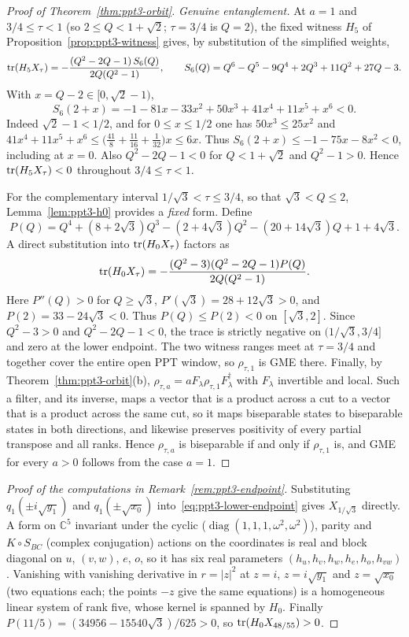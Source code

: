 \begin{proof}[Proof of Theorem~\ref{thm:ppt3-orbit}]
\emph{Genuine entanglement.} At $a=1$ and $3/4\le \tau<1$ (so $2\le Q<1+\sqrt2$; $\tau=3/4$ is $Q=2$), the fixed witness
$H_5$ of Proposition~\ref{prop:ppt3-witness} gives, by substitution of the simplified weights,
\[
 \operatorname{tr}(H_5X_\tau)=-\frac{(Q^2-2Q-1)\,S_6(Q)}{2Q(Q^2-1)},\qquad
 S_6(Q)=Q^6-Q^5-9Q^4+2Q^3+11Q^2+27Q-3 .
\]
With $x=Q-2\in[0,\sqrt2-1)$,
\[
S_6(2+x)=-1-81x-33x^2+50x^3+41x^4+11x^5+x^6<0 .
\]
Indeed $\sqrt2-1<1/2$, and for $0\le x\le1/2$ one has $50x^3\le25x^2$ and
$41x^4+11x^5+x^6\le\bigl(\tfrac{41}8+\tfrac{11}{16}+\tfrac1{32}\bigr)x\le6x$.
Thus $S_6(2+x)\le-1-75x-8x^2<0$, including at $x=0$. Also $Q^2-2Q-1<0$ for $Q<1+\sqrt2$ and
$Q^2-1>0$. Hence $\operatorname{tr}(H_5X_\tau)<0$ throughout $3/4\le \tau<1$.

For the complementary interval $1/\sqrt3<\tau\le3/4$,
so that $\sqrt3<Q\le2$, Lemma~\ref{lem:ppt3-h0}
provides a \emph{fixed} form. Define
\[
P(Q)=Q^4+(8+2\sqrt3)Q^3-(2+4\sqrt3)Q^2
 -(20+14\sqrt3)Q+1+4\sqrt3.
\]
A direct substitution into $\operatorname{tr}(H_0X_\tau)$ factors as
\[
 \operatorname{tr}(H_0X_\tau)=
 -\frac{(Q^2-3)(Q^2-2Q-1)P(Q)}
 {2Q(Q^2-1)}.
\]
Here $P''(Q)>0$ for $Q\ge\sqrt3$,
$P'(\sqrt3)=28+12\sqrt3>0$, and
$P(2)=33-24\sqrt3<0$. Thus
$P(Q)\le P(2)<0$ on $[\sqrt3,2]$.
Since $Q^2-3>0$ and $Q^2-2Q-1<0$,
the trace is strictly negative on
$(1/\sqrt3,3/4]$ and zero at the lower endpoint.
The two witness ranges meet at $\tau=3/4$ and together cover the entire open PPT window, so $\rho_{\tau,1}$ is GME there. Finally, by
Theorem~\ref{thm:ppt3-orbit}(b), $\rho_{\tau,a}=aF_\lambda\rho_{\tau,1}F_\lambda^\dagger$ with $F_\lambda$ invertible and local.
Such a filter, and its inverse, maps a vector that is a product across a cut to a vector that is a product across the same cut,
so it maps biseparable states to biseparable states in both directions, and likewise preserves positivity of every partial
transpose and all ranks. Hence $\rho_{\tau,a}$ is biseparable if and only if $\rho_{\tau,1}$ is, and GME for every $a>0$
follows from the case $a=1$.
\end{proof}

\begin{proof}[Proof of the computations in Remark~\ref{rem:ppt3-endpoint}]
Substituting $q_1(\pm i\sqrt{y_1})$ and $q_1(\pm\sqrt{x_0})$
into~\eqref{eq:ppt3-lower-endpoint} gives $X_{1/\sqrt3}$ directly. A form on $\mathbb C^5$ invariant under the cyclic
($\operatorname{diag}(1,1,1,\omega^2,\omega^2)$), parity and $K\circ S_{BC}$ (complex conjugation) actions on the coordinates
is real and block diagonal on $u$, $(v,w)$, $e$, $o$, so it has six real parameters $(h_u,h_v,h_w,h_e,h_o,h_{vw})$. Vanishing
with vanishing derivative in $r=|z|^2$ at $z=i$, $z=i\sqrt{y_1}$ and $z=\sqrt{x_0}$ (two equations each; the points $-z$ give the
same equations) is a homogeneous linear system of rank five, whose kernel is spanned by $H_0$. Finally
$P(11/5)=(34956-15540\sqrt3)/625>0$, so $\operatorname{tr}(H_0X_{48/55})>0$.
\end{proof}

